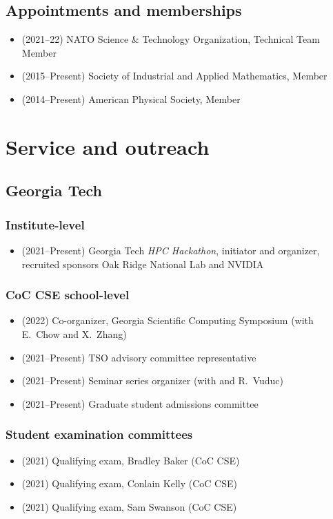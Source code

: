 \subsection{Appointments and memberships}

\begin{itemize}
    \item (2021--22) NATO Science \& Technology Organization, Technical Team Member
    \item (2015--Present) Society of Industrial and Applied Mathematics, Member
    \item (2014--Present) American Physical Society, Member
\end{itemize}

\section{Service and outreach}

\subsection{Georgia Tech}

\subsubsection{Institute-level}
\begin{itemize}
    \item (2021--Present) Georgia Tech \textit{HPC Hackathon}, initiator and organizer, recruited sponsors Oak Ridge National Lab and NVIDIA 
\end{itemize}

\subsubsection{CoC CSE school-level}
\begin{itemize}
    \item (2022) Co-organizer, Georgia Scientific Computing Symposium (with E.\ Chow and X.\ Zhang)
    \item (2021--Present) TSO advisory committee representative
    \item (2021--Present) Seminar series organizer (with \Florian and R.\ Vuduc)
    \item (2021--Present) Graduate student admissions committee
\end{itemize}

\subsubsection{Student examination committees}
\begin{itemize}
    \item (2021) Qualifying exam, Bradley Baker (CoC CSE)
    \item (2021) Qualifying exam, Conlain Kelly (CoC CSE)
    \item (2021) Qualifying exam, Sam Swanson (CoC CSE)
\end{itemize}

